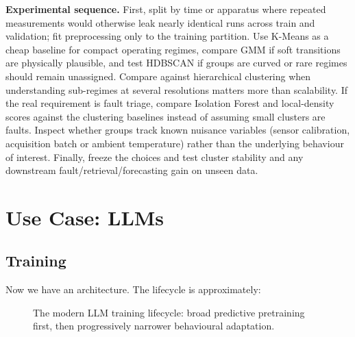 \textbf{Experimental sequence.}
First, split by time or apparatus where repeated measurements would otherwise leak nearly identical runs across train and validation; fit preprocessing only to the training partition.
Use K-Means as a cheap baseline for compact operating regimes, compare GMM if soft transitions are physically plausible, and test HDBSCAN if groups are curved or rare regimes should remain unassigned.
Compare against hierarchical clustering when understanding sub-regimes at several resolutions matters more than scalability.
If the real requirement is fault triage, compare Isolation Forest and local-density scores against the clustering baselines instead of assuming small clusters are faults.
Inspect whether groups track known nuisance variables (sensor calibration, acquisition batch or ambient temperature) rather than the underlying behaviour of interest.
Finally, freeze the choices and test cluster stability and any downstream fault/retrieval/forecasting gain on unseen data.

\section{Use Case: LLMs}
\label{chap:usecase_LLMs}
\subsection{Training}
\label{sec:modern-llm-training-lifecycle}
Now we have an architecture.
The lifecycle is approximately:

\begin{figure}[htbp]
\centering
{}
\caption{The modern LLM training lifecycle: broad predictive pretraining first, then progressively narrower behavioural adaptation.}
\label{fig:modern-llm-training-lifecycle}
\end{figure}

